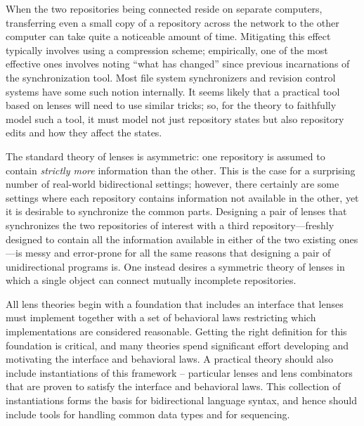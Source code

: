 \documentclass{article}
\begin{document}

When the two repositories being connected reside on separate computers,
transferring even a small copy of a repository across the network to the
other computer can take quite a noticeable amount of time. Mitigating this
effect typically involves using a compression scheme; empirically, one of
the most effective ones involves noting ``what has changed'' since previous
incarnations of the synchronization tool. Most file system synchronizers and
revision control systems have some such notion internally.  It seems likely
that a practical tool based on lenses will need to use similar tricks; so,
for the theory to faithfully model such a tool, it must model not just
repository states but also repository edits and how they affect the states.

The standard theory of lenses is asymmetric: one repository is assumed to
contain \emph{strictly more} information than the other. This is the case
for a surprising number of real-world bidirectional settings; however, there
certainly are some settings where each repository contains information not
available in the other, yet it is desirable to synchronize the common parts.
Designing a pair of lenses that synchronizes the two repositories of
interest with a third repository---freshly designed to contain all the
information available in either of the two existing ones---is messy and
error-prone for all the same reasons that designing a pair of unidirectional
programs is. One instead desires a symmetric theory of lenses in which a
single object can connect mutually incomplete repositories.

All lens theories begin with a foundation that includes an interface that
lenses must implement together with a set of behavioral laws restricting
which implementations are considered reasonable. Getting the right
definition for this foundation is critical, and many theories spend
significant effort developing and motivating the interface and behavioral
laws. A practical theory should also include instantiations of this
framework -- particular lenses and lens combinators that are proven to
satisfy the interface and behavioral laws. This collection of instantiations
forms the basis for bidirectional language syntax, and hence should include
tools for handling common data types and for sequencing.
\end{document}
